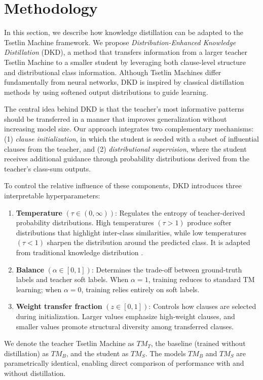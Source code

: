 \documentclass[sn-mathphys-num]{sn-jnl}%
\theoremstyle{thmstyleone}%
\theoremstyle{thmstyletwo}%
\theoremstyle{thmstylethree}%
\begin{document}
\section{Methodology}
In this section, we describe how knowledge distillation can be adapted to the Tsetlin Machine framework. We propose \textit{Distribution-Enhanced Knowledge Distillation} (DKD), a method that transfers information from a larger teacher Tsetlin Machine to a smaller student by leveraging both clause-level structure and distributional class information. Although Tsetlin Machines differ fundamentally from neural networks, DKD is inspired by classical distillation methods by using softened output distributions to guide learning.

The central idea behind DKD is that the teacher's most informative patterns should be transferred in a manner that improves generalization without increasing model size. Our approach integrates two complementary mechanisms: (1) \textit{clause initialization}, in which the student is seeded with a subset of influential clauses from the teacher, and (2) \textit{distributional supervision}, where the student receives additional guidance through probability distributions derived from the teacher's class-sum outputs.

To control the relative influence of these components, DKD introduces three interpretable hyperparameters:
\begin{enumerate}
	\item \textbf{Temperature} $(\tau \in (0,\infty))$: Regulates the entropy of teacher-derived probability distributions. High temperatures $(\tau > 1)$ produce softer distributions that highlight inter-class similarities, while low temperatures $(\tau < 1)$ sharpen the distribution around the predicted class. It is adapted from traditional knowledge distribution \cite{hinton2015distillingknowledgeneuralnetwork}.
	\item \textbf{Balance} $(\alpha \in [0,1])$: Determines the trade-off between ground-truth labels and teacher soft labels. When $\alpha = 1$, training reduces to standard TM learning; when $\alpha = 0$, training relies entirely on soft labels.
	\item \textbf{Weight transfer fraction} $(z \in [0,1])$: Controls how clauses are selected during initialization. Larger values emphasize high-weight clauses, and smaller values promote structural diversity among transferred clauses.
\end{enumerate}

We denote the teacher Tsetlin Machine as $TM_T$, the baseline (trained without distillation) as $TM_B$, and the student as $TM_S$. The models $TM_B$ and $TM_S$ are parametrically identical, enabling direct comparison of performance with and without distillation.
\end{document}
